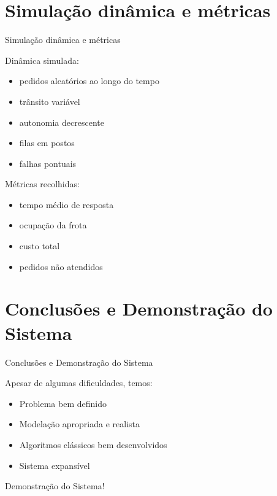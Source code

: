 \documentclass[13pt, handout]{beamer}
\begin{document}
\section{Simulação dinâmica e métricas}

\begin{frame}{Simulação dinâmica e métricas}

    Dinâmica simulada:
    \begin{itemize}
        \item pedidos aleatórios ao longo do tempo
        \item trânsito variável
        \item autonomia decrescente
        \item filas em postos
        \item falhas pontuais
    \end{itemize}

    \vspace{0.5cm}
    Métricas recolhidas:
    \begin{itemize}
        \item tempo médio de resposta
        \item ocupação da frota
        \item custo total
        \item pedidos não atendidos
    \end{itemize}
    
\end{frame}

\section{Conclusões e Demonstração do Sistema}

\begin{frame}{Conclusões e Demonstração do Sistema}
    
    Apesar de algumas dificuldades, temos:
    \begin{itemize}
        \item Problema bem definido
        \item Modelação apropriada e realista
        \item Algoritmos clássicos bem desenvolvidos
        \item Sistema expansível
    \end{itemize}

    \vspace{0.5cm}
    Demonstração do Sistema!
    
\end{frame}

\frame{\titlepage}
\end{document}
